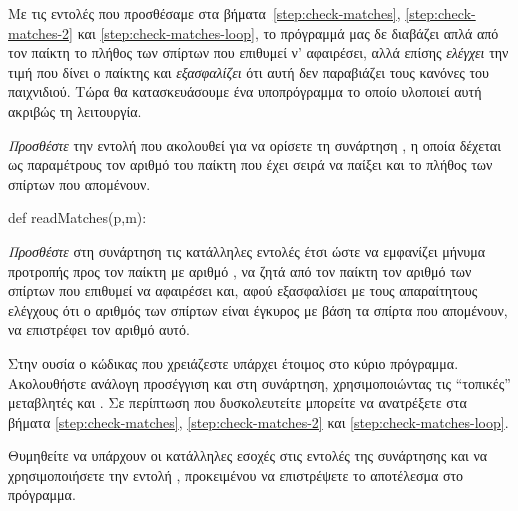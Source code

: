 \documentclass[a4paper,11pt,oneside]{book}
\begin{document}
\begin{step}
Με τις εντολές που προσθέσαμε στα βήματα~\ref{step:check-matches}, \ref{step:check-matches-2} και \ref{step:check-matches-loop}, το πρόγραμμά μας δε διαβάζει απλά από τον παίκτη το πλήθος των σπίρτων που επιθυμεί ν' αφαιρέσει, αλλά επίσης \emph{ελέγχει} την τιμή που δίνει ο παίκτης και \emph{εξασφαλίζει} ότι αυτή δεν παραβιάζει τους κανόνες του παιχνιδιού. Τώρα θα κατασκευάσουμε ένα υποπρόγραμμα το οποίο υλοποιεί αυτή ακριβώς τη λειτουργία.

\emph{Προσθέστε} την εντολή που ακολουθεί για να ορίσετε τη συνάρτηση , η οποία δέχεται ως παραμέτρους τον αριθμό  του παίκτη που έχει σειρά να παίξει και το πλήθος  των σπίρτων που απομένουν.

\begin{pynew}
def readMatches(p,m):            
\end{pynew} 

\emph{Προσθέστε} στη συνάρτηση τις κατάλληλες εντολές έτσι ώστε να εμφανίζει μήνυμα προτροπής προς τον παίκτη με αριθμό , να ζητά από τον παίκτη τον αριθμό των σπίρτων που επιθυμεί να αφαιρέσει και, αφού εξασφαλίσει με τους απαραίτητους ελέγχους ότι ο αριθμός των σπίρτων είναι έγκυρος με βάση τα σπίρτα  που απομένουν, να επιστρέφει τον αριθμό αυτό.

\begin{note}
Στην ουσία ο κώδικας που χρειάζεστε υπάρχει έτοιμος στο κύριο πρόγραμμα. Ακολουθήστε ανάλογη προσέγγιση και στη συνάρτηση, χρησιμοποιώντας τις ``τοπικές'' μεταβλητές  και . Σε περίπτωση που δυσκολευτείτε μπορείτε να ανατρέξετε στα βήματα \ref{step:check-matches}, \ref{step:check-matches-2} και \ref{step:check-matches-loop}. 

Θυμηθείτε να υπάρχουν οι κατάλληλες εσοχές στις εντολές της συνάρτησης και να χρησιμοποιήσετε την εντολή , προκειμένου να επιστρέψετε το αποτέλεσμα στο πρόγραμμα.
\end{note}
\end{step}
\end{document}
